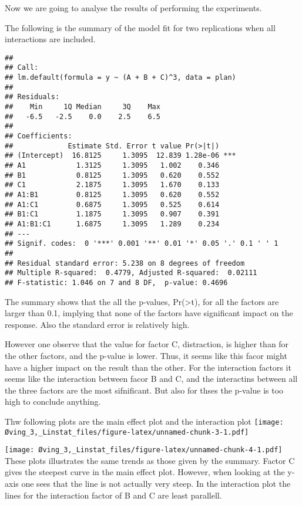 \documentclass[]{article}
\begin{document}
Now we are going to analyse the results of performing the experiments.

The following is the summary of the model fit for two replications when
all interactions are included.

\begin{verbatim}
## 
## Call:
## lm.default(formula = y ~ (A + B + C)^3, data = plan)
## 
## Residuals:
##    Min     1Q Median     3Q    Max 
##   -6.5   -2.5    0.0    2.5    6.5 
## 
## Coefficients:
##             Estimate Std. Error t value Pr(>|t|)    
## (Intercept)  16.8125     1.3095  12.839 1.28e-06 ***
## A1            1.3125     1.3095   1.002    0.346    
## B1            0.8125     1.3095   0.620    0.552    
## C1            2.1875     1.3095   1.670    0.133    
## A1:B1         0.8125     1.3095   0.620    0.552    
## A1:C1         0.6875     1.3095   0.525    0.614    
## B1:C1         1.1875     1.3095   0.907    0.391    
## A1:B1:C1      1.6875     1.3095   1.289    0.234    
## ---
## Signif. codes:  0 '***' 0.001 '**' 0.01 '*' 0.05 '.' 0.1 ' ' 1
## 
## Residual standard error: 5.238 on 8 degrees of freedom
## Multiple R-squared:  0.4779, Adjusted R-squared:  0.02111 
## F-statistic: 1.046 on 7 and 8 DF,  p-value: 0.4696
\end{verbatim}

The summary shows that the all the p-values,
Pr(\textgreater{}\textbar{}t\textbar{}), for all the factors are larger
than 0.1, implying that none of the factors have significant impact on
the response. Also the standard error is relatively high.

However one observe that the value for factor C, distraction, is higher
than for the other factors, and the p-value is lower. Thus, it seems
like this facor might have a higher impact on the result than the other.
For the interaction factors it seems like the interaction between facor
B and C, and the interactins between all the three factors are the most
sifnificant. But also for thses the p-value is too high to conclude
anything.

Thw following plots are the main effect plot and the interaction plot
\texttt{[image: Øving\_3,\_Linstat\_files/figure-latex/unnamed-chunk-3-1.pdf]}

\texttt{[image: Øving\_3,\_Linstat\_files/figure-latex/unnamed-chunk-4-1.pdf]}
These plots illustrates the same trends as those given by the summary.
Factor C gives the steepest curve in the main effect plot. However, when
looking at the y-axis one sees that the line is not actually very steep.
In the interaction plot the lines for the interaction factor of B and C
are least parallell.
\end{document}
